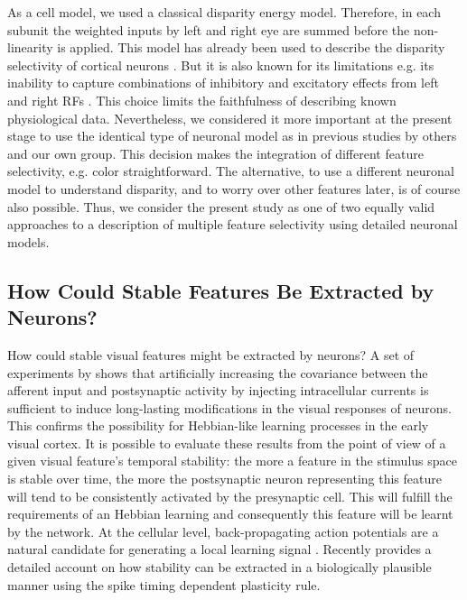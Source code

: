 {As a cell model, we used a classical disparity energy model. Therefore, in
each subunit the weighted inputs by left and right eye are summed before
the non-linearity is applied. This model has already been used to describe
the disparity selectivity of cortical neurons \citep{ohzawa1990a}. But it
is also known for its limitations e.g. its inability to capture
combinations of inhibitory and excitatory effects from left and right RFs
\citep{read2002a}. This choice limits the faithfulness of describing known
physiological data. Nevertheless, we considered it more important at the
present stage to use the identical type of neuronal model as in previous
studies by others and our own group. This decision makes the integration of
different feature selectivity, e.g. color \citep{einhauser2003a}
straightforward. The alternative, to use a different neuronal model to
understand disparity, and to worry over other features later, is of course
also possible. Thus, we consider the present study as one of two equally
valid approaches to a description of multiple feature selectivity using
detailed neuronal models. 
		 
			

\subsection{How Could Stable Features Be Extracted by Neurons?}


How could stable visual features might be extracted by neurons? A set of
experiments by \cite{fregnac1999b} shows that artificially increasing the
covariance between the afferent input and postsynaptic activity by
injecting intracellular currents is sufficient to induce long-lasting
modifications in the visual responses of neurons. This confirms the
possibility for Hebbian-like learning processes in the early visual cortex.
It is possible to evaluate these results from the point of view of a given
visual feature's temporal stability: the more a feature in the stimulus
space is stable over time, the more the postsynaptic neuron representing
this feature will tend to be consistently activated by the presynaptic
cell.  This will fulfill the requirements of an Hebbian learning and
consequently this feature will be learnt by the network. At the cellular
level, back-propagating action potentials \citep{larkum1999a} are a natural
candidate for generating a local learning signal \citep{kording2001a}.
Recently \cite{sprekeler2007a} provides a detailed account on how stability
can be extracted in a biologically plausible manner using the spike timing
dependent plasticity rule.

}
